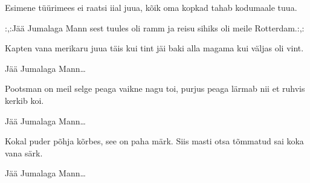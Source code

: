 Esimene t\"u\"urimees ei raatsi iial juua,
k\~oik oma kopkad tahab kodumaale tuua.

:,:J\"a\"a Jumalaga Mann sest tuules oli ramm
ja reisu sihiks oli meile Rotterdam.:,: 

Kapten vana merikaru juua t\"ais kui tint
j\"ai baki alla magama kui v\"aljas oli vint.

J\"a\"a Jumalaga Mann\ldots

Pootsman on meil selge peaga vaikne nagu toi,
purjus peaga l\"armab nii et ruhvis kerkib koi.

J\"a\"a Jumalaga Mann\ldots

Kokal puder p\~ohja k\~orbes, see on paha m\"ark.
Siis masti otsa t\~ommatud sai koka vana s\"ark.

J\"a\"a Jumalaga Mann\ldots

